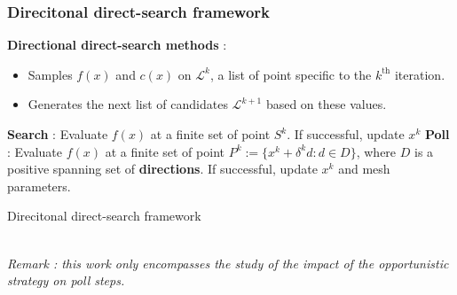 \documentclass[11pt,utf8,compress]{beamer}
\def\L{{\mathcal{L}}}
\begin{document}
\begin{frame}%
\frametitle{Direcitonal direct-search framework}
\textbf{Directional direct-search methods} :
\begin{itemize}
	\pause
	\item Samples $f(x)$ and $c(x)$ on $\L^k$, a list of point specific to the $k^{\text{th}}$ iteration.
	\pause
	\item Generates the next list of candidates $\L^{k+1}$ based on these values.
\end{itemize}
\pause
\setcounter{algorithm}{0}
\begin{minipage}{0.7\linewidth}
	\begin{algorithm}[H]
		\scriptsize
		\begin{algorithmic}[]
			\STATE \textbf{Search} : Evaluate $f(x)$ at a finite set of point $S^k$.
			\STATE If successful, update $x^k$
			\STATE
			\STATE \textbf{Poll} : Evaluate $f(x)$ at a finite set of point 
			\STATE $P^k:=\{x^k+\delta ^k d:d\in D\}$, where $D$ is a positive spanning set of \textbf{directions}. 
			\STATE If successful, update $x^k$ and mesh parameters.
			\ENDFOR
		\end{algorithmic}
		\caption{Direcitonal direct-search framework}
		\label{alg:seq}
	\end{algorithm}
\end{minipage}\\	
\textit{Remark : this work only encompasses the study of the impact of the opportunistic strategy on poll steps.}
\end{frame}
\end{document}
